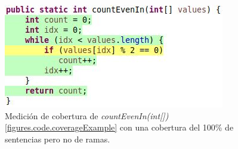 \begin{figure}
	\centering
	\includegraphics[width=.90\linewidth]{figures/branchCoverageExampleIncomplete.JPG}
	\caption{Medici\'on de cobertura de \emph{countEvenIn(int[])} \ref{figures.code.coverageExample} con una cobertura del 100\% de sentencias pero no de ramas.}
	\label{figures.examples.coverage.stmtCoverage}
\end{figure}

